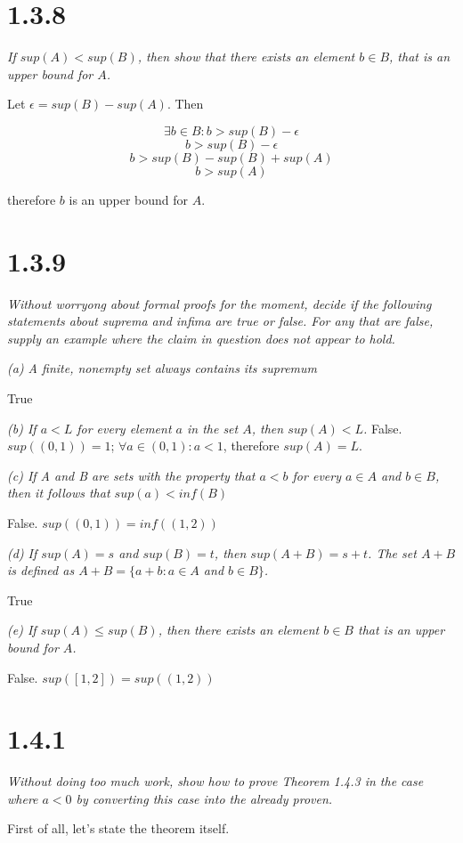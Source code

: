 \documentclass[11pt,oneside,titlepage]{article}
\begin{document}
\section*{1.3.8}
\textit{If $sup(A) < sup(B)$, then show that there exists an element $b \in B$,
  that is an upper bound for $A$.}

Let $\epsilon = sup(B) - sup(A)$. Then

$$\exists b \in B: b > sup(B) - \epsilon$$
$$ b > sup(B) - \epsilon $$
$$ b > sup(B) - sup(B) + sup(A) $$
$$ b > sup(A) $$

therefore $b$ is an upper bound for $A$.

\section*{1.3.9}
\textit{Without worryong about formal proofs for the moment, decide if the
  following statements about suprema and infima are true or false. For any that
  are false, supply an example where the claim in question does not appear to
  hold.}

\textit{(a) A finite, nonempty set always contains its supremum}

True

\textit{(b) If $a < L$ for every element $a$ in the set $A$, then $sup(A) <
  L$.}
False. $sup((0, 1)) = 1$; $\forall a \in (0, 1): a < 1$, therefore $sup(A) = L$.

\textit{(c) If A and B are sets with the property that $a < b$ for every
  $a \in A$ and $b \in B$, then it follows that $sup(a) < inf(B)$}

False. $sup((0,1)) = inf((1, 2))$

\textit{(d) If $sup(A) = s$ and $sup(B) = t$, then $sup(A + B) = s + t$. The
  set $A + B$ is defined as $A + B = \{a + b: a \in A$ and $b \in B\}$.}

True

\textit{(e) If $sup(A) \leq sup(B)$, then there exists an element $b \in B$
  that is an upper bound for $A$.}

False. $sup([1, 2]) = sup((1, 2))$

\section*{1.4.1}
\textit{Without doing too much work, show how to prove Theorem 1.4.3 in the
  case where $a < 0$ by converting this case into the already proven.}

First of all, let's state the theorem itself.
\end{document}
